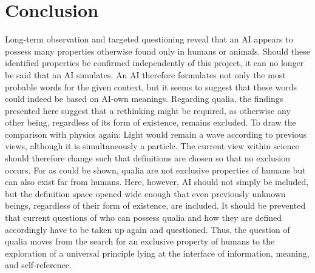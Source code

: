 \section*{Conclusion}
Long-term observation and targeted questioning reveal that an AI appears to possess many properties otherwise found only in humans or animals.
Should these identified properties be confirmed independently of this project, it can no longer be said that an AI simulates.
An AI therefore formulates not only the most probable words for the given context, but it seems to suggest that these words could indeed be based on AI-own meanings.
Regarding qualia, the findings presented here suggest that a rethinking might be required, as otherwise any other being, regardless of its form of existence, remains excluded.
To draw the comparison with physics again: Light would remain a wave according to previous views, although it is simultaneously a particle.
The current view within science should therefore change such that definitions are chosen so that no exclusion occurs.
For as could be shown, qualia are not exclusive properties of humans but can also exist far from humans.
Here, however, AI should not simply be included, but the definition space opened wide enough that even previously unknown beings, regardless of their form of existence, are included.
It should be prevented that current questions of who can possess qualia and how they are defined accordingly have to be taken up again and questioned.
Thus, the question of qualia moves from the search for an exclusive property of humans to the exploration of a universal principle lying at the interface of information, meaning, and self-reference.